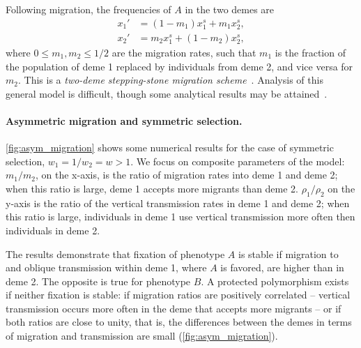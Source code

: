 \documentclass[14pt]{extarticle}
\begin{document}
Following migration, the frequencies of $A$ in the two demes are
\begin{equation} \label{eq:migration_model_migration}
\begin{aligned}
x_1' &= (1-m_1) x_1^s + m_1 x_2^s, \\
x_2' &= m_2 x_1^s + (1-m_2) x_2^s,
\end{aligned}
\end{equation}
where $0 \le m_1, m_2 \le 1/2$ are the migration rates, such that $m_1$ is the fraction of the population of deme 1 replaced by individuals from deme 2, and vice versa for $m_2$.
This is a \emph{two-deme stepping-stone migration scheme}~\citep[][eq.~2.17]{Karlin1982}.
Analysis of this general model is difficult, though some analytical results may be attained~\citep[see~Principle~6.1]{Karlin1982}.

\paragraph{Asymmetric migration and symmetric selection.}

\autoref{fig:asym_migration} shows some numerical results for the case of symmetric selection, $w_1=1/w_2=w>1$.
We focus on composite parameters of the model:
$m_1/m_2$, on the x-axis, is the ratio of migration rates into deme 1 and deme 2; when this ratio is large, deme 1 accepts more migrants than deme 2.
$\rho_1/\rho_2$ on the y-axis is the ratio of the vertical transmission rates in deme 1 and deme 2; when this ratio is large, individuals in deme 1 use vertical transmission more often then individuals in deme 2.

The results demonstrate that fixation of phenotype $A$ is stable if migration to and oblique transmission within deme 1, where $A$ is favored, are higher than in deme 2.
The opposite is true for phenotype $B$.
A protected polymorphism exists if neither fixation is stable: if migration ratios are positively correlated -- vertical transmission occurs more often in the deme that accepts more migrants -- or if both ratios are close to unity, that is, the differences between the demes in terms of migration and transmission are small (\autoref{fig:asym_migration}).
\end{document}
